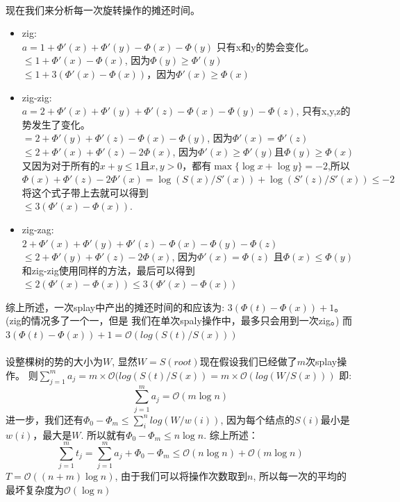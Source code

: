 \documentclass{article}
\begin{document}
		\paragraph{}
			现在我们来分析每一次旋转操作的摊还时间。
			\begin{itemize}
				\item zig: \\
				$a = 1 + \Phi'(x) + \Phi'(y) - \Phi(x) - \Phi(y)$ 只有x和y的势会变化。 \\
				$\leq 1 + \Phi'(x) - \Phi(x)$, 因为$\Phi(y) \geq \Phi'(y)$ \\
				$\leq 1 + 3(\Phi'(x) - \Phi(x))$，因为$\Phi'(x) \geq \Phi(x)$ 
				\item zig-zig: \\
				$a = 2 + \Phi'(x) + \Phi'(y) + \Phi'(z) - \Phi(x) - \Phi(y) - \Phi(z)$, 只有x,y,z的势发生了变化。\\
				$= 2 + \Phi'(y) + \Phi'(z) - \Phi(x) - \Phi(y)$, 因为$\Phi'(x) = \Phi'(z)$ \\
				$\leq 2 + \Phi'(x) + \Phi'(z) - 2\Phi(x)$, 因为$\Phi'(x) \geq \Phi'(y)$且$\Phi(y) \geq \Phi(x)$\\
				又因为对于所有的$x+y \leq 1$且$x,y > 0$，都有$\max\{\log x + \log y\} = -2$,所以
				$\Phi(x) + \Phi'(z) - 2\Phi'(x) = \log(S(x)/S'(x)) + \log(S'(z)/S'(x)) \leq -2$
				将这个式子带上去就可以得到\\$\leq 3(\Phi'(x) - \Phi(x))$.
				\item zig-zag: \\
				$2 + \Phi'(x) + \Phi'(y) + \Phi'(z) - \Phi(x) - \Phi(y) - \Phi(z)$ \\
				$\leq 2 + \Phi'(y) + \Phi'(z) - 2\Phi(x)$, 因为$\Phi'(x) = \Phi(z)$ 且$\Phi(x) \leq \Phi(y)$\\
				和zig-zig使用同样的方法，最后可以得到\\
				$\leq 2(\Phi'(x) - \Phi(x)) \leq 3(\Phi'(x) - \Phi(x))$
			\end{itemize}
			综上所述，一次splay中产出的摊还时间的和应该为: $3(\Phi(t) - \Phi(x)) + 1$。(zig的情况多了一个一，但是
			我们在单次spaly操作中，最多只会用到一次zig。)
			而$3(\Phi(t) - \Phi(x)) + 1 = \mathcal{O}(log(S(t)/S(x)))$
		\paragraph{}
			设整棵树的势的大小为$W$, 显然$W = S(root)$现在假设我们已经做了$m$次splay操作。
			则$\sum_{j=1}^m a_j = m \times \mathcal{O}(log(S(t)/S(x)) = m \times \mathcal{O}(log(W/S(x)))$
			即:
			\begin{displaymath}
				\sum_{j=1}^m a_j = \mathcal{O}(m\log n)
			\end{displaymath}
			进一步，我们还有$\Phi_0 - \Phi_m \leq \sum_i^n log(W/w(i))$, 因为每个结点的$S(i)$最小是$w(i)$，最大是$W$.
			所以就有$\Phi_0 - \Phi_m \leq n\log n$.
			综上所述：
			\begin{displaymath}
				\sum_{j=1}^m t_j = \sum_{j=1}^m a_j + \Phi_0 - \Phi_m \leq \mathcal{O}(n\log n) + \mathcal{O}(m\log n)
			\end{displaymath}
			$T = \mathcal{O}((n+m)\log n)$, 由于我们可以将操作次数取到$n$, 所以每一次的平均的最坏复杂度为$\mathcal{O}(\log n)$
\end{document}
